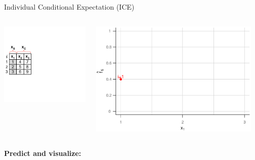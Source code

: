 \documentclass[11pt,compress,t,notes=noshow, aspectratio=169, xcolor=table]{beamer}
\begin{document}
\begin{vbframe}{Individual Conditional Expectation (ICE)}
\begin{columns}[T]
\begin{column}{0.45\textwidth}
\includegraphics[page=3, trim=0cm 0.35cm 0.85cm 0.35cm, width=\textwidth]{figure_man/ice_plot_demo}
\end{column}
\begin{column}{0.55\textwidth}
\includegraphics[page=1, width=0.95\textwidth]{figure/ICE}
\end{column}
\end{columns}
\vspace*{\topsep}

\textbf{Predict and visualize:}


\end{vbframe}
\end{document}
